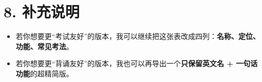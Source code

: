\documentclass[11pt,fontset=none]{ctexart}
\begin{document}
\section*{8. 补充说明}
\begin{itemize}
\item 若你想要更“考试友好”的版本，我可以继续把这张表改成四列：\textbf{名称、定位、功能、常见考法}。
\item 若你想要更“背诵友好”的版本，我也可以再导出一个\textbf{只保留英文名 + 一句话功能}的超精简版。
\end{itemize}
\end{document}
